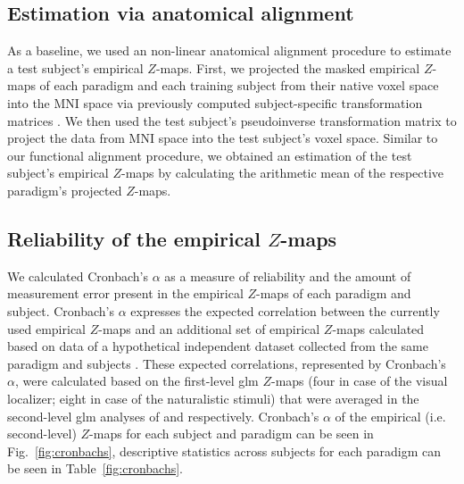 \subsection{Estimation via anatomical alignment}
%
As a baseline, we used an non-linear anatomical alignment procedure to estimate
a test subject's empirical $Z$-maps.
%
First, we projected the masked empirical $Z$-maps of each paradigm and each
training subject from their native voxel space into the MNI space via previously
computed subject-specific transformation matrices
\citep[][\href{https://github.com/psychoinformatics-de/studyforrest-data-templatetransforms}{\url{github.com/psychoinformatics-de/studyforrest-data-templatetransforms}}]{hanke2014audiomovie}.
We then used the test subject's pseudoinverse transformation matrix to project
the data from MNI space into the test subject's voxel space.
Similar to our functional alignment procedure, we obtained an estimation of the
test subject's empirical $Z$-maps by calculating the arithmetic mean of the
respective paradigm's projected $Z$-maps.



\subsection{Reliability of the empirical $Z$-maps}
%
We calculated Cronbach's $\alpha$ as a measure of reliability and the amount of
measurement error \citep{cronbach1951coefficient, cortina1993coefficient}
present in the empirical $Z$-maps of each paradigm and subject.
%
Cronbach's $\alpha$ expresses the expected correlation between the currently
used empirical $Z$-maps and an additional set of empirical $Z$-maps calculated
based on data of a hypothetical independent dataset collected from the same
paradigm and subjects \citep{jiahui2020predicting, jiahui2022cross}.
%
These expected correlations, represented by Cronbach's $\alpha$, were calculated
based on the first-level \ac{glm} $Z$-maps (four in case of the visual
localizer; eight in case of the naturalistic stimuli) that were averaged in the
second-level \ac{glm} analyses of \citet{sengupta2016extension} and
\citet{haeusler2022processing} respectively.
%
Cronbach's $\alpha$ of the empirical (i.e. second-level) $Z$-maps for each
subject and paradigm can be seen in Fig.~\ref{fig:cronbachs}, descriptive
statistics across subjects for each paradigm can be seen in
Table~\ref{fig:cronbachs}.


